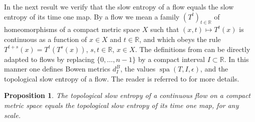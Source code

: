 \documentclass[a4paper,oneside]{amsart}
\renewcommand{\(}{\begin{dmath*}}
\renewcommand{\)}{\end{dmath*}}
\newtheorem{proposition}[theorem]{Proposition}
\theoremstyle{definition}
\newcommand{\R}{\mathbb{R}}
\newcommand{\spa}{\operatorname{spa}}
\begin{document}
In the next result we verify that the slow entropy of a flow equals the slow entropy of its time one map. By a flow we mean a family $(T^{t})_{t\in \R}$ of homeomorphisms of  a compact metric space $X$ such that $(x,t)\mapsto T^{t}(x)$ is continuous as a function of $x\in X$ and $t\in\R$, and which obeys the rule $T^{t+s}(x)=T^{t}(T^{s}(x))$, $s,t\in \R$, $x\in X$. The definitions from  can be directly adapted to flows by replacing $\{0,\dots,n-1\}$ by a compact interval $I\subset \R$. In this manner one defines Bowen metrics $d^B_I$, the values  $\spa(T,I,\epsilon)$, and the topological slow entropy of a flow. The reader is referred to \cite[Section 1.1]{kanigowski_slow_2019} for more details.
\begin{proposition}\label{slow-entropy-of-flows-and-transformations}
The topological slow entropy of a continuous flow on a compact metric space equals the topological slow entropy of its time one map, for any scale.  
\end{proposition}
\end{document}
